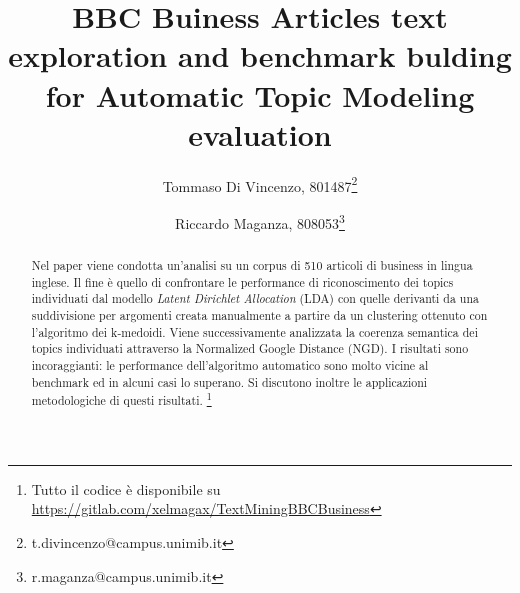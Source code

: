 \documentclass[]{article}
\title{BBC Buiness Articles text exploration and benchmark bulding for Automatic Topic Modeling evaluation}
\author{Tommaso Di Vincenzo, 801487\footnote{t.divincenzo@campus.unimib.it} \and Riccardo Maganza, 808053\footnote{r.maganza@campus.unimib.it}}
\begin{document}
\renewcommand{\abstractname}{Abstract}

\maketitle

\begin{abstract}
Nel paper viene condotta un'analisi su un corpus di 510 articoli di business in lingua inglese. Il fine è quello di confrontare le performance di riconoscimento dei topics individuati dal modello \textit{Latent Dirichlet Allocation} (LDA) con quelle derivanti da una suddivisione per argomenti creata manualmente a partire da un clustering ottenuto con l'algoritmo dei k-medoidi. Viene successivamente analizzata la coerenza semantica dei topics individuati attraverso la Normalized Google Distance (NGD). I risultati sono incoraggianti: le performance dell'algoritmo automatico sono molto vicine al benchmark ed in alcuni casi lo superano. Si discutono inoltre le applicazioni metodologiche di questi risultati. \footnote{Tutto il codice è disponibile su \url{https://gitlab.com/xelmagax/TextMiningBBCBusiness}}
\end{abstract}
\end{document}
